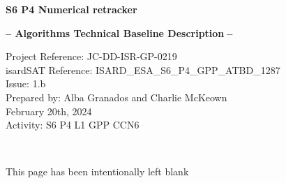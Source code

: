 \documentclass[11pt,a4paper]{article}
\newcommand\projref{JC-DD-ISR-GP-0219}
\newcommand\isdref{ISARD\_ESA\_S6\_P4\_GPP\_ATBD\_1287}
\newcommand\thedate{February 20th, 2024}
\newcommand\issueno{1.b}
\newcommand\activityref{S6 P4 L1 GPP CCN6 }
\newcommand\thetitle{S6 P4 Numerical retracker}
\newcommand\thesubtitle{Algorithms Technical
Baseline Description}
\newcommand\writtenby{Alba Granados and Charlie McKeown}
\begin{document}
\setlength{\parskip}{8pt}

% 

\thispagestyle{cover}


        
    \begin{center}
        \vspace*{3.5cm}
                
        \begin{flushright}
        
        \begin{spacing}{2.5}        
        {\Huge \textbf{\thetitle}}
        
        \vspace{2cm}
        {\Huge \textbf{-- \thesubtitle $\;$--}}
        \end{spacing}

        \end{flushright}
            
        \vspace{7.5cm}
        \begin{flushright}
        \large
        Project Reference:  \projref\\ 
        isardSAT Reference: \isdref \\
        Issue: \issueno \\
        
        \bigskip
        Prepared by: \writtenby\\
        \thedate \\
        Activity: \activityref
        \end{flushright}
    
    \end{center}




\clearpage
\newpage

\begin{center}
$\quad$

\vspace{0.4\textheight}

This page has been intentionally left blank

\end{center}
\end{document}
